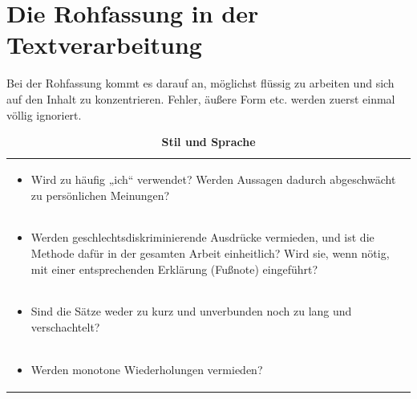 \documentclass[]{book}
\providecommand{\tightlist}{%
  \setlength{\itemsep}{0pt}\setlength{\parskip}{0pt}}
\theoremstyle{definition}
\theoremstyle{definition}
\theoremstyle{definition}
\theoremstyle{remark}
\begin{document}
\section{Die Rohfassung in der
Textverarbeitung}\label{die-rohfassung-in-der-textverarbeitung}

Bei der Rohfassung kommt es darauf an, möglichst flüssig zu arbeiten und
sich auf den Inhalt zu konzentrieren. Fehler, äußere Form etc. werden
zuerst einmal völlig ignoriert.

\begin{longtable}[]{@{}l@{}}
\caption{\textbf{\label{tab:stil2} Stil und Sprache}}\tabularnewline
\toprule
\begin{minipage}[t]{0.97\columnwidth}\raggedright\strut
\begin{itemize}
\tightlist
\item
  Wird zu häufig „ich`` verwendet? Werden Aussagen dadurch abgeschwächt
  zu persönlichen Meinungen? \vspace{-6mm}
\end{itemize}\strut
\end{minipage}\tabularnewline
\begin{minipage}[t]{0.97\columnwidth}\raggedright\strut
\begin{itemize}
\tightlist
\item
  Werden geschlechtsdiskriminierende Ausdrücke vermieden, und ist die
  Methode dafür in der gesamten Arbeit einheitlich? Wird sie, wenn
  nötig, mit einer entsprechenden Erklärung (Fußnote) eingeführt?
  \vspace{-6mm}
\end{itemize}\strut
\end{minipage}\tabularnewline
\begin{minipage}[t]{0.97\columnwidth}\raggedright\strut
\begin{itemize}
\tightlist
\item
  Sind die Sätze weder zu kurz und unverbunden noch zu lang und
  verschachtelt? \vspace{-6mm}
\end{itemize}\strut
\end{minipage}\tabularnewline
\begin{minipage}[t]{0.97\columnwidth}\raggedright\strut
\begin{itemize}
\tightlist
\item
  Werden monotone Wiederholungen vermieden? \vspace{-6mm}
\end{itemize}\strut
\end{minipage}\tabularnewline

\end{longtable}
\end{document}
